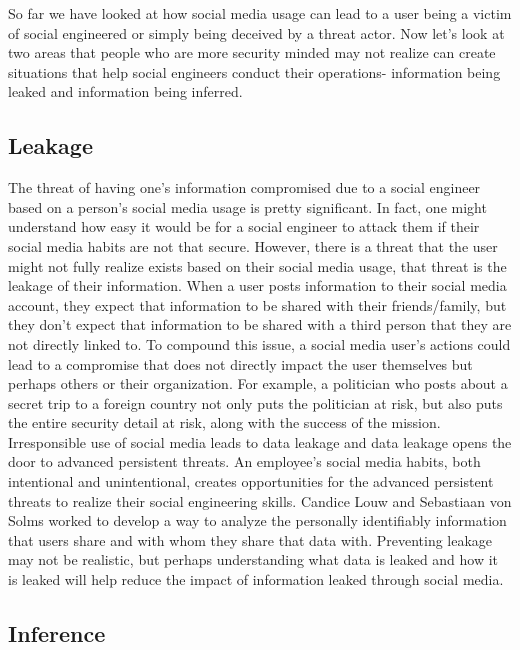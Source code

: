 \documentclass[conference]{IEEEtran}
\begin{document}
So far we have looked at how social media usage can lead to a user being a victim of social engineered or simply being deceived by a threat actor.  Now let's look at two areas that people who are more security minded may not realize can create situations that help social engineers conduct their operations- information being leaked and information being inferred. 

\subsection{Leakage}

The threat of having one's information compromised due to a social engineer based on a person's social media usage is pretty significant. In fact, one might understand how easy it would be for a social engineer to attack them if their social media habits are not that secure. However, there is a threat that the user might not fully realize exists based on their social media usage, that threat is the leakage of their information.  When a user posts information to their social media account, they expect that information to be shared with their friends/family, but they don't expect that information to be shared with a third person that they are not directly linked to.  To compound this issue, a social media user's actions could lead to a compromise that does not directly impact the user themselves but perhaps others or their organization.  For example, a politician who posts about a secret trip to a foreign country not only puts the politician at risk, but also puts the entire security detail at risk, along with the success of the mission. Irresponsible use of social media leads to data leakage and data leakage opens the door to advanced persistent threats. An employee's social media habits, both intentional and unintentional, creates opportunities for the advanced persistent threats to realize their social engineering skills\cite{molok_chang_atif_ahmad_2010}. Candice Louw and Sebastiaan von Solms worked to develop a way to analyze the personally identifiably information that users share and with whom they share that data with\cite{Louw:2013:PII:2513456.2513467}. Preventing leakage may not be realistic, but perhaps understanding what data is leaked and how it is leaked will help reduce the impact of information leaked through social media.   

\subsection{Inference}
\end{document}
